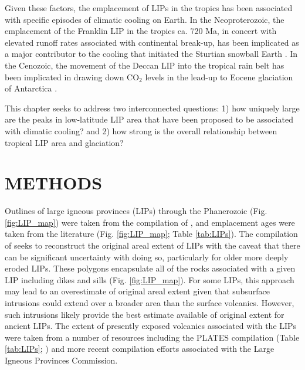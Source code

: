 \documentclass[11pt,letterpaper]{article}
\begin{document}
Given these factors, the emplacement of LIPs in the tropics has been associated with specific episodes of climatic cooling on Earth. In the Neoproterozoic, the emplacement of the Franklin LIP in the tropics ca. 720 Ma, in concert with elevated runoff rates associated with continental break-up, has been implicated as a major contributor to the cooling that initiated the Sturtian snowball Earth \citep{Donnadieu2004b, Cox2016}. In the Cenozoic, the movement of the Deccan LIP into the tropical rain belt has been implicated in drawing down CO$_2$ levels in the lead-up to Eocene glaciation of Antarctica \citep{Kent2008a}.


This chapter seeks to address two interconnected questions: 1)  how uniquely large are the peaks in low-latitude LIP area that have been proposed to be associated with climatic cooling? and 2) how strong is the overall relationship between tropical LIP area and glaciation?

\section*{METHODS}

Outlines of large igneous provinces (LIPs) through the Phanerozoic (Fig. \ref{fig:LIP_map}) were taken from the compilation of \cite{Ernst2017a}, and emplacement ages were taken from the literature (Fig. \ref{fig:LIP_map}; Table \ref{tab:LIPs}). The compilation of \cite{Ernst2017a} seeks to reconstruct the original areal extent of LIPs with the caveat that there can be significant uncertainty with doing so, particularly for older more deeply eroded LIPs. These polygons encapsulate all of the rocks associated with a given LIP including dikes and sills (Fig. \ref{fig:LIP_map}). For some LIPs, this approach may lead to an overestimate of original areal extent given that subsurface intrusions could extend over a broader area than the surface volcanics. However, such intrusions likely provide the best estimate available of original extent for ancient LIPs. The extent of presently exposed volcanics associated with the LIPs were taken from a number of resources including the PLATES compilation (Table \ref{tab:LIPs}; \citealp{Coffin2006a}) and more recent compilation efforts associated with the Large Igneous Provinces Commission. 
\end{document}

